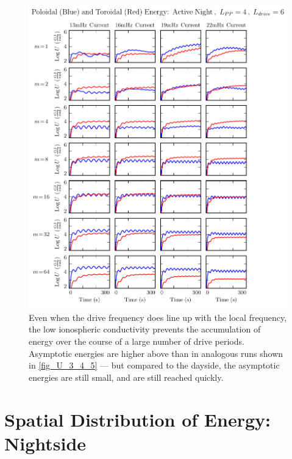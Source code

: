 \begin{figure}[!htb]
    \centering
    \includegraphics[width=\textwidth]{figures/U_3_4_6.pdf}
    \caption[Poloidal and Toroidal Energy: Active Night, Driving at $L=6$]{
      Even when the drive frequency does line up with the local \Alfven frequency, the low ionospheric conductivity prevents the accumulation of energy over the course of a large number of drive periods. Asymptotic energies are higher above than in analogous runs shown in \cref{fig_U_3_4_5} --- but compared to the dayside, the asymptotic energies are still small, and are still reached quickly. 
    }
    \label{fig_U_3_4_6}
\end{figure}

\section{Spatial Distribution of Energy: Nightside}
  \label{sec_layers_night}

